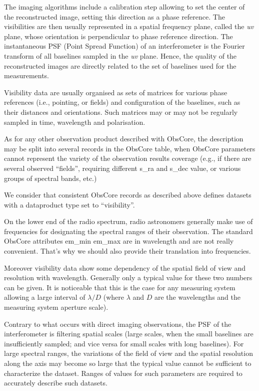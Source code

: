 \documentclass[11pt,a4paper]{ivoa}
\begin{document}
The imaging algorithms include a calibration step allowing to set the center of the 
reconstructed image, setting this direction as a phase reference. The visibilities
are then usually represented in a spatial frequency plane, called the \emph{uv} plane, 
whose orientation is perpendicular to phase reference direction. The instantaneous PSF 
(Point Spread Function) of an interferometer is the Fourier transform of all baselines 
sampled in the \emph{uv} plane. Hence, the quality of the reconstructed images are 
directly related to the set of baselines used for the measurements.

Visibility data are usually organised as sets of matrices for various phase references
(i.e., pointing, or fields) and configuration of the baselines, such as their
distances and orientations. Such matrices may or may not be regularly sampled in time, 
wavelength and polarisation.
    
As for any other observation product described with ObsCore, the description may be split into
several records in the ObsCore table, when ObsCore parameters cannot represent the 
variety of the observation results coverage (e.g., if there are several observed ``fields'', 
requiring different s\_ra and s\_dec value, or various groups of spectral bands, etc.) 

We consider that consistent ObsCore records as described above defines datasets with 
a dataproduct type set to ``visibility''.

On the lower end of the radio spectrum, radio astronomers generally make use of 
frequencies for designating the spectral ranges of their observation. The standard 
ObsCore attributes em\_min em\_max  are in wavelength and are not really convenient. 
That's why we should also provide their translation into frequencies. 
        
Moreover visibility data show some dependency of the spatial field of view and resolution 
with wavelength. Generally only a typical value for these two numbers can be given. It is 
noticeable that this is the case for any measuring system allowing a large interval of 
$\lambda/D$ (where $\lambda$ and $D$ are the wavelengths and the measuring system
aperture scale). 

Contrary to what occurs with direct imaging observations, the PSF of the interferometer
is filtering spatial scales (large scales, when the small baselines are insufficiently 
sampled; and vice versa for small scales with long baselines).
For large spectral ranges, the variations of the field of view and the spatial resolution 
along the axis may become so large that the typical value cannot be sufficient to 
characterize the dataset. Ranges of values for such parameters are required to accurately 
describe such datasets.
\end{document}
